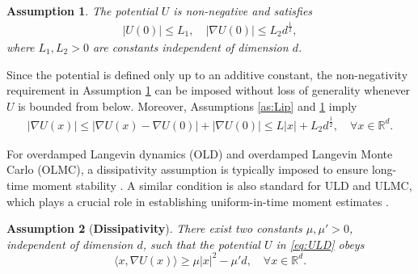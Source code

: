 \documentclass[12pt]{article}
\numberwithin{equation}{section}
\newtheorem{assumption}{Assumption}[section]
\begin{document}
\begin{assumption}\label{as:U_0-bound}
The potential $U$ is non-negative and satisfies 
\begin{align}
|U(0)|
\leq 
L_1, 
\quad 
|\nabla U(0)|
\leq 
L_2 d^{\frac{1}{2}},
\end{align}
where $L_1, L_2 > 0$ are constants independent of dimension $d$.
\end{assumption}


Since the potential is defined only up to an additive constant, the non-negativity requirement in Assumption \ref{as:U_0-bound} can be imposed without loss of generality whenever \(U\) is bounded from below. Moreover, Assumptions \ref{as:Lip} and \ref{as:U_0-bound} imply
\begin{align}\label{eq:lip-2}
    |\nabla U(x)| 
    \leq 
    |\nabla U(x)-\nabla U(0)| + |\nabla U(0)|
    \leq 
    L |x| + L_2 d^{\frac{1}{2}},
    \quad 
    \forall
    x \in \mathbb{R}^d
    .
\end{align}




For overdamped Langevin dynamics (OLD) and overdamped Langevin Monte Carlo (OLMC), a dissipativity assumption is typically imposed to ensure long-time moment stability \cite{majka2020nonasymptotic,mou2022improved,yang2025non}. 
A similar condition is also standard for ULD and ULMC, which plays a crucial role in establishing uniform-in-time moment estimates \cite{Xu2024error}. 


\begin{assumption}[\textbf{Dissipativity}]\label{as:dissipativity}
    There exist two constants $\mu, \mu'>0$, independent of dimension $d$, such that the potential $U$ in \eqref{eq:ULD} obeys
    \begin{equation}
        \big\langle 
        x, \nabla U(x)
        \big\rangle
        \geq 
        \mu |x|^2-\mu'd,
        \quad 
        \forall
        x \in \mathbb{R}^d.
    \end{equation}
\end{assumption}
\end{document}
